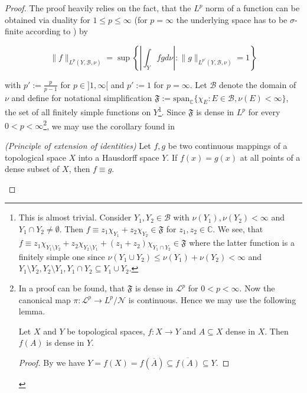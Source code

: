 \begin{proof}
	The proof heavily relies on the fact, that the $L^p$ norm of a function can be obtained via duality for $1 \leqslant p \leqslant \infty$ (for $p = \infty$ the underlying space has to be $\sigma$-finite according to \cite[288--289]{elstrodt:mass:2011}) by 
	
	\begin{equation*}
		\|f\|_{L^p(Y,\mathcal{B},\nu)} = \sup \left\{ \left\vert \int_Y fgd\nu\right\vert : \|g\|_{L^{p'}(Y,\mathcal{B},\nu)} = 1\right\}
	\end{equation*}

with $p' := \frac{p}{p - 1}$ for $p \in ]1,\infty[$ and $p' := 1$ for $p = \infty$. Let $\mathcal{B}$ denote the domain of $\nu$ and define for notational simplification $\mathfrak{F} := \mathrm{span}_{\mathbb{C}}\{\chi_E: E \in \mathcal{B},\nu(E) < \infty\}$, the set of all finitely simple functions on $Y$\footnote{
		This is almost trivial. Consider $Y_1,Y_2 \in \mathcal{B}$ with $\nu(Y_1),\nu(Y_2) < \infty$ and $Y_1 \cap Y_2 \neq \emptyset$. Then $f \equiv z_1\chi_{Y_1} + z_2\chi_{Y_2} \in \mathfrak{F}$ for $z_1,z_2 \in \mathbb{C}$. We see, that $f \equiv z_1 \chi_{Y_1\setminus Y_2} + z_2 \chi_{Y_2\setminus Y_1} + (z_1 + z_2)\chi_{Y_1 \cap Y_2} \in \mathfrak{F}$ where the latter function is a finitely simple one since $\nu(Y_1 \cup Y_2) \leqslant \nu(Y_1) + \nu(Y_2) < \infty$ and $Y_1\setminus Y_2,Y_2 \setminus Y_1, Y_1 \cap Y_2 \subseteq Y_1 \cup Y_2$.	
	}. Since $\mathfrak{F}$ is dense in $L^p$ for every $0 < p < \infty$\footnote{
		In \cite[242]{elstrodt:mass:2011} a proof can be found, that $\mathfrak{F}$ is dense in $\mathcal{L}^p$ for $0< p < \infty$. Now the canonical map $\pi: \mathcal{L}^p \rightarrow L^p/\mathcal{N}$ is continuous. Hence we may use the following lemma.

		\begin{lemma}
			Let $X$ and $Y$ be topological spaces, $f: X \rightarrow Y$ and $A \subseteq X$ dense in $X$. Then $f(A)$ is dense in $Y$. 
		\end{lemma}

		\begin{proof}
			By \cite[104]{munkres:topology:2000} we have $Y = f(X) = f(\overline{A})  \subseteq \overline{f(A)} \subseteq Y$.
		\end{proof}
		
		
	}, we may use the corollary found in \cite[76]{bourbaki:general_topology:1995}
	
	\begin{corollary}\emph{(Principle of extension of identities)}
		Let $f,g$ be two continuous mappings of a topological space $X$ into a Hausdorff space $Y$. If $f(x) = g(x)$ at all points of a dense subset of $X$, then $f \equiv g$.
	\end{corollary}


\end{proof}
